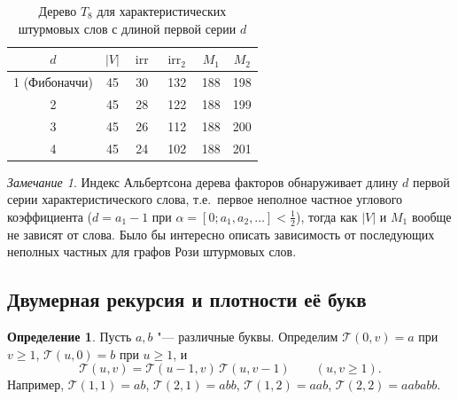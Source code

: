 \documentclass[a4paper,14pt]{extreport}
\theoremstyle{plain}
\theoremstyle{definition}
\newtheorem{definition}{Определение}[section]
\theoremstyle{remark}
\newtheorem{remark}{Замечание}
\begin{document}
\begin{table}[H]
	\centering
	\caption{Дерево $T_8$ для характеристических штурмовых слов с длиной первой серии $d$}
	\begin{tabular}{|c|c|c|c|c|c|}
		\hline
		$d$ & $|V|$ & $\operatorname{irr}$ & $\operatorname{irr}_2$ & $M_1$ & $M_2$ \\ \hline
		1 (Фибоначчи) & 45 & 30 & 132 & 188 & 198 \\ \hline
		2 & 45 & 28 & 122 & 188 & 199 \\ \hline
		3 & 45 & 26 & 112 & 188 & 200 \\ \hline
		4 & 45 & 24 & 102 & 188 & 201 \\ \hline
	\end{tabular}
\end{table}

\begin{remark}
	Индекс Альбертсона дерева факторов обнаруживает длину $d$ первой серии характеристического слова, т.е.\ первое неполное частное углового коэффициента ($d=a_1-1$ при $\alpha=[0;a_1,a_2,\dots]<\tfrac12$),
	тогда как $|V|$ и $M_1$ вообще не зависят от слова. Было бы интересно описать зависимость от последующих неполных частных для графов Рози штурмовых слов.
\end{remark}

\subsection{Двумерная рекурсия и плотности её букв}\label{sec04}

\begin{definition}\label{newfibword}
	Пусть $a,b$ "--- различные буквы. Определим $\mathscr T(0,v)=a$ при $v\ge1$, $\mathscr T(u,0)=b$ при $u\ge1$, и
	\begin{equation}
		\mathscr T(u,v)=\mathscr T(u-1,v)\,\mathscr T(u,v-1)\qquad(u,v\ge1).
	\end{equation}
	Например, $\mathscr T(1,1)=ab$, $\mathscr T(2,1)=abb$, $\mathscr T(1,2)=aab$, $\mathscr T(2,2)=aababb$.
\end{definition}
\end{document}

